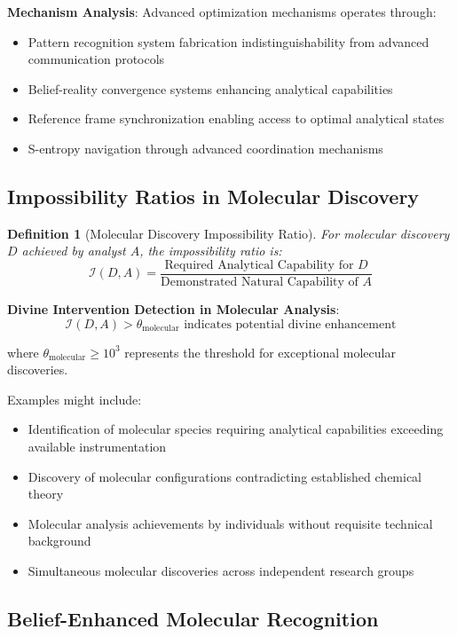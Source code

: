 \documentclass[11pt,a4paper]{article}
\newtheorem{definition}[theorem]{Definition}
\theoremstyle{remark}
\begin{document}
\textbf{Mechanism Analysis}: Advanced optimization mechanisms operates through:
\begin{itemize}
\item Pattern recognition system fabrication indistinguishability from advanced communication protocols
\item Belief-reality convergence systems enhancing analytical capabilities
\item Reference frame synchronization enabling access to optimal analytical states
\item S-entropy navigation through advanced coordination mechanisms
\end{itemize}

\subsection{Impossibility Ratios in Molecular Discovery}

\begin{definition}[Molecular Discovery Impossibility Ratio]
For molecular discovery $D$ achieved by analyst $A$, the impossibility ratio is:
$$\mathcal{I}(D,A) = \frac{\text{Required Analytical Capability for } D}{\text{Demonstrated Natural Capability of } A}$$
\end{definition}

\textbf{Divine Intervention Detection in Molecular Analysis}:
$$\mathcal{I}(D,A) > \theta_{\text{molecular}} \text{ indicates potential divine enhancement}$$

where $\theta_{\text{molecular}} \geq 10^3$ represents the threshold for exceptional molecular discoveries.

Examples might include:
\begin{itemize}
\item Identification of molecular species requiring analytical capabilities exceeding available instrumentation
\item Discovery of molecular configurations contradicting established chemical theory
\item Molecular analysis achievements by individuals without requisite technical background
\item Simultaneous molecular discoveries across independent research groups
\end{itemize}

\subsection{Belief-Enhanced Molecular Recognition}
\end{document}
